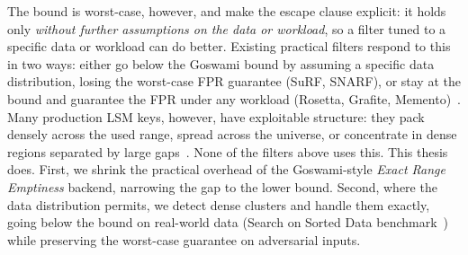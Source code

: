 The bound is worst-case, however, and \citet{vaidya2022snarf} make
the escape clause explicit: it holds only \emph{without further assumptions on the data or workload},
so a filter tuned to a specific data or workload can do better.
Existing practical filters respond to this in two ways:
either go below the Goswami bound by assuming a specific data distribution,
losing the worst-case FPR guarantee (SuRF, SNARF),
or stay at the bound and guarantee the FPR under any workload
(Rosetta, Grafite, Memento)~\citep{luo2020rosetta,grafite2024,eslami2024memento}.
Many production LSM keys, however, have exploitable structure: they pack densely across the used range, spread across the universe, or concentrate in dense regions separated by large gaps~\citep{cao2020facebook}.
None of the filters above uses this.
This thesis does.
First, we shrink the practical overhead of the Goswami-style \emph{Exact Range Emptiness} backend,
narrowing the gap to the lower bound.
Second, where the data distribution permits, we detect dense clusters and handle them exactly,
going below the bound on real-world data (Search on Sorted Data benchmark~\citep{kipf2019sosd})
while preserving the worst-case guarantee on adversarial inputs.

